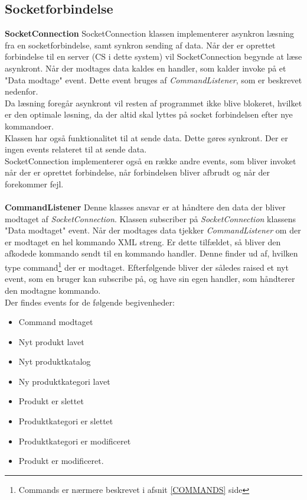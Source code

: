 \subsection{Socketforbindelse} \label{SOCKET}
\textbf{SocketConnection}
SocketConnection klassen implementerer asynkron læsning fra en socketforbindelse, samt synkron sending af data. Når der er oprettet forbindelse til en server (\gls{CS} i dette system) vil SocketConnection begynde at læse asynkront. Når der modtages data kaldes en handler, som kalder invoke på et "Data modtage" event. Dette event bruges af \textit{CommandListener}, som er beskrevet nedenfor.\\
Da læsning foregår asynkront vil resten af programmet ikke blive blokeret, hvilket er den optimale løsning, da der altid skal lyttes på socket forbindelsen efter nye kommandoer.\\
Klassen har også funktionalitet til at sende data. Dette gøres synkront. Der er ingen events relateret til at sende data.\\
SocketConnection implementerer også en række andre events, som bliver invoket når der er oprettet forbindelse, når forbindelsen bliver afbrudt og når der forekommer fejl.\\\\
 

\textbf{CommandListener}
Denne klasses ansvar er at håndtere den data der bliver modtaget af \textit{SocketConnection}. Klassen subscriber på \textit{SocketConnection} klassens "Data modtaget" event. Når der modtages data tjekker \textit{CommandListener} om der er modtaget en hel kommando XML streng. Er dette tilfældet, så bliver den afkodede kommando sendt til en kommando handler. Denne finder ud af, hvilken type command\footnote{Commands er nærmere beskrevet i afsnit \ref{COMMANDS} side \pageref{COMMANDS}} der er modtaget. Efterfølgende bliver der således raised et nyt event, som en bruger kan subscribe på, og have sin egen handler, som håndterer den modtagne kommando.\\
Der findes events for de følgende begivenheder:

\begin{itemize}
	\item Command modtaget
	\item Nyt produkt lavet
	\item Nyt produktkatalog
	\item Ny produktkategori lavet
	\item Produkt er slettet
	\item Produktkategori er slettet
	\item Produktkategori er modificeret
	\item Produkt er modificeret.
\end{itemize}

